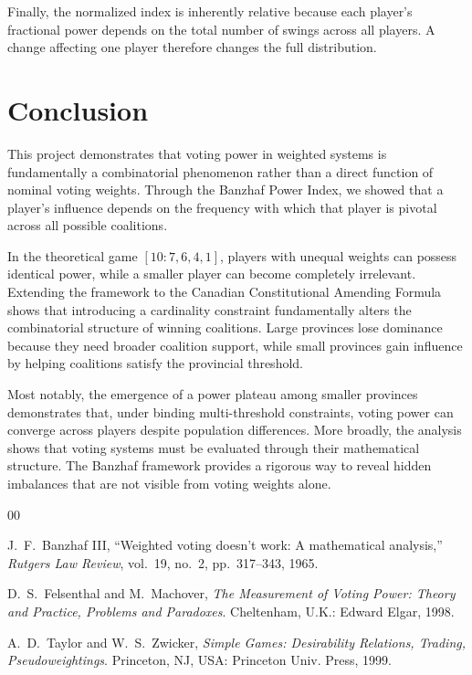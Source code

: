 \documentclass[lettersize,journal]{IEEEtran}
\begin{document}
Finally, the normalized index is inherently relative because each player's fractional power depends on the total number of swings across all players. A change affecting one player therefore changes the full distribution.

\section{Conclusion}
This project demonstrates that voting power in weighted systems is fundamentally a combinatorial phenomenon rather than a direct function of nominal voting weights. Through the Banzhaf Power Index, we showed that a player's influence depends on the frequency with which that player is pivotal across all possible coalitions.

In the theoretical game $[10:7,6,4,1]$, players with unequal weights can possess identical power, while a smaller player can become completely irrelevant. Extending the framework to the Canadian Constitutional Amending Formula shows that introducing a cardinality constraint fundamentally alters the combinatorial structure of winning coalitions. Large provinces lose dominance because they need broader coalition support, while small provinces gain influence by helping coalitions satisfy the provincial threshold.

Most notably, the emergence of a power plateau among smaller provinces demonstrates that, under binding multi-threshold constraints, voting power can converge across players despite population differences. More broadly, the analysis shows that voting systems must be evaluated through their mathematical structure. The Banzhaf framework provides a rigorous way to reveal hidden imbalances that are not visible from voting weights alone.

\begin{thebibliography}{00}

J.~F.~Banzhaf III, ``Weighted voting doesn't work: A mathematical analysis,'' \emph{Rutgers Law Review}, vol.~19, no.~2, pp.~317--343, 1965.

D.~S.~Felsenthal and M.~Machover, \emph{The Measurement of Voting Power: Theory and Practice, Problems and Paradoxes}. Cheltenham, U.K.: Edward Elgar, 1998.

A.~D.~Taylor and W.~S.~Zwicker, \emph{Simple Games: Desirability Relations, Trading, Pseudoweightings}. Princeton, NJ, USA: Princeton Univ. Press, 1999.

\end{thebibliography}
\end{document}
